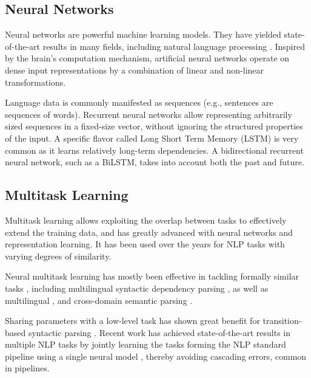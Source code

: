 \documentclass[12pt]{report}
\begin{document}
\subsection{Neural Networks}\label{sec:neural_networks}

Neural networks are powerful machine learning models.
They have yielded state-of-the-art results in many fields,
including natural language processing \cite{goldberg2016primer}.
Inspired by the brain's computation mechanism,
artificial neural networks operate on dense input representations
by a combination of linear and non-linear transformations.

Language data is commonly manifested as sequences
(e.g., sentences are sequences of words).
Recurrent neural networks \cite{elman1990finding} allow representing
arbitrarily sized sequences in a fixed-size vector,
without ignoring the structured properties of the input.
A specific flavor called Long Short Term Memory
(LSTM) is very common as it learns relatively long-term dependencies.
A bidirectional recurrent neural network, such as a BiLSTM,
takes into account both the past and future.


\subsection{Multitask Learning}\label{sec:multitask}

Multitask learning \cite{caruana1998multitask} allows exploiting the overlap between tasks
to effectively extend the training data, 
and has greatly advanced with neural networks and representation learning.
It has been used over the years for NLP tasks with varying degrees of similarity.

Neural multitask learning has mostly been effective in tackling formally similar
tasks \cite{P16-2038},
including
multilingual syntactic dependency parsing \cite{Q16-1031,guo2016exploiting},
as well as multilingual \cite{duong2017multilingual},
and cross-domain semantic parsing \cite{herzig-berant:2017:Short,W17-2607}.

Sharing parameters with a low-level task
has shown great benefit for transition-based syntactic parsing
\cite{bohnet2012transition,Zhang2016StackpropagationIR,constant-nivre:2016:P16-1,more2016joint}.
Recent work has achieved state-of-the-art results in multiple NLP tasks
by jointly learning the tasks forming the NLP standard pipeline using 
a single neural model \cite{collobert2011natural,D17-1206},
thereby avoiding cascading errors, common in pipelines.
\end{document}
